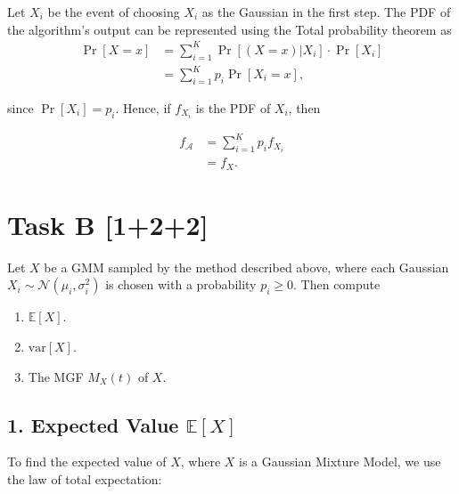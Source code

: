 
Let $X_i$ be the event of choosing $X_i$ as the Gaussian in the first step. The
PDF of the algorithm's output can be represented using the Total probability
theorem as
\begin{equation*}
    \begin{aligned}
        \Pr[X=x] &= \sum_{i=1}^{K}\Pr\left[(X=x)|X_i\right]\cdot \Pr[X_i] \\
        &= \sum_{i=1}^{K}p_i\Pr[X_i=x],
    \end{aligned}
\end{equation*}

since $\Pr[X_i] = p_i$. Hence, if $f_{X_i}$ is the PDF of $X_i$, then

\begin{equation*}
    \begin{aligned}
        f_\mathcal{A} &= \sum_{i=1}^{K}p_if_{X_i} \\
        &= f_X.
    \end{aligned}
\end{equation*}


\section*{\colS{$\S$} Task B \hfill \normalfont \large [1+2+2]}

\begin{tcolorbox}
    Let $X$ be a GMM sampled by the method described above, where each Gaussian
    $X_i \sim \mathcal{N}(\mu_i, \sigma_i^2)$ is chosen with a probability
    $p_i \ge 0$. Then compute

    \vspace{10pt}
    \begin{enumerate}
        \item $\mathbb{E}[X]$.
        \item $\text{var}[X]$.
        \item The MGF $M_X(t)$ of $X$.
    \end{enumerate}
\end{tcolorbox}


\subsection*{1. Expected Value $\mathbb{E}[X]$}

To find the expected value of $X$, where $X$ is a Gaussian Mixture Model, we use
the law of total expectation:

